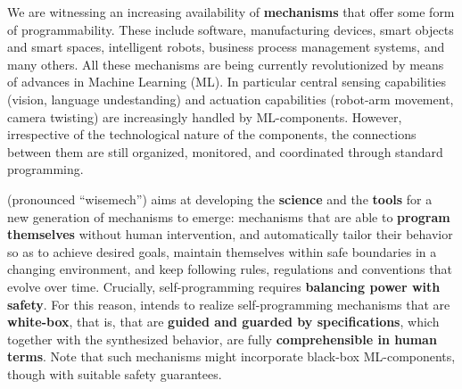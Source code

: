 



We are witnessing an increasing availability of \textbf{mechanisms}
that offer some form of programmability.
These include software, manufacturing devices, smart objects and smart
spaces, intelligent robots, business process management systems, and
many others.
All these mechanisms are being currently revolutionized by means of
advances in Machine Learning (ML).  In particular central sensing
capabilities (vision, language undestanding) and actuation
capabilities (robot-arm movement, camera twisting) are increasingly
 handled by ML-components.
However, irrespective of the technological nature of the components, the connections between them are still
organized, monitored, and coordinated through standard programming.

\project (pronounced ``wisemech'') aims at developing the \textbf{science} and the \textbf{tools} for a new
generation of mechanisms to emerge: mechanisms that are able to
\textbf{program themselves} without human intervention, and
automatically tailor their behavior so as to
achieve desired goals,  maintain themselves within safe boundaries in a
changing environment, and keep following rules,
regulations and conventions that evolve over time. 
Crucially, self-programming requires \textbf{balancing power with safety}.
For this reason, \project intends 
to realize self-programming mechanisms that are \textbf{white-box},
that is, 
that are \textbf{guided and guarded by %
specifications}, which together with the synthesized behavior, 
are fully \textbf{comprehensible in human terms}.
Note that such mechanisms might incorporate black-box
ML-components, though with suitable safety guarantees.


